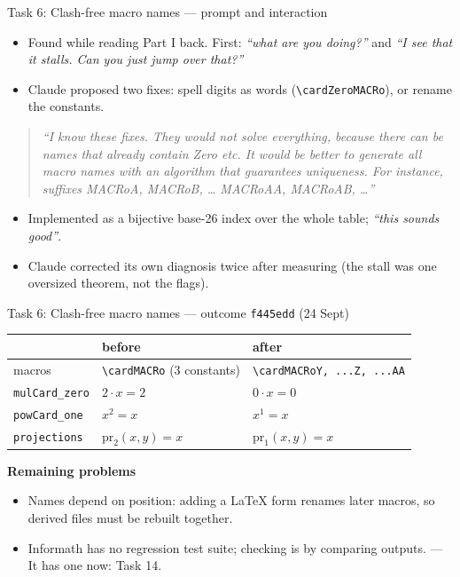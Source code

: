 \documentclass[10pt,aspectratio=169]{beamer}
\newcommand{\bad}[1]{\textcolor{warn}{#1}}
\newcommand{\ok}[1]{\textcolor{good}{#1}}
\newcommand{\commit}[1]{\texttt{\footnotesize #1}}
\newcommand{\prompt}[1]{\begin{quote}\small\itshape ``#1''\end{quote}}
\begin{document}
\begin{frame}{Task 6: Clash-free macro names --- prompt and interaction}
  \begin{itemize}\small
    \item Found while reading Part I back. First: \emph{``what are you doing?''}
          and \emph{``I see that it stalls. Can you just jump over that?''}
    \item Claude proposed two fixes: spell digits as words
          (\texttt{\textbackslash cardZeroMACRo}), or rename the constants.
  \end{itemize}
  \prompt{I know these fixes. They would not solve everything, because there
    can be names that already contain Zero etc. It would be better to generate
    all macro names with an algorithm that guarantees uniqueness. For instance,
    suffixes MACRoA, MACRoB, \dots{} MACRoAA, MACRoAB, \dots}
  \begin{itemize}\small
    \item Implemented as a bijective base-26 index over the whole table;
          \emph{``this sounds good''}.
    \item Claude corrected its own diagnosis twice after measuring
          (the stall was one oversized theorem, not the flags).
  \end{itemize}
\end{frame}

\begin{frame}{Task 6: Clash-free macro names --- outcome}
  \commit{f445edd} (24 Sept)
  \begin{center}\small
  \begin{tabular}{lll}
    \toprule
    & \textbf{before} & \textbf{after} \\
    \midrule
    macros & \texttt{\textbackslash cardMACRo} (3 constants)
           & \texttt{\textbackslash cardMACRoY, ...Z, ...AA} \\
    \texttt{mulCard\_zero} & \bad{$2 \cdot x = 2$} & \ok{$0 \cdot x = 0$} \\
    \texttt{powCard\_one} & \bad{$x^2 = x$} & \ok{$x^1 = x$} \\
    \texttt{projections} & \bad{$\mathrm{pr}_2(x,y) = x$} & \ok{$\mathrm{pr}_1(x,y) = x$} \\
    \bottomrule
  \end{tabular}
  \end{center}
  \textbf{Remaining problems}
  \begin{itemize}\small
    \item Names depend on position: adding a LaTeX form renames later macros,
          so derived files must be rebuilt together.
    \item Informath has no regression test suite; checking is by comparing outputs.
          \ok{--- It has one now: Task 14.}
  \end{itemize}
\end{frame}
\end{document}
